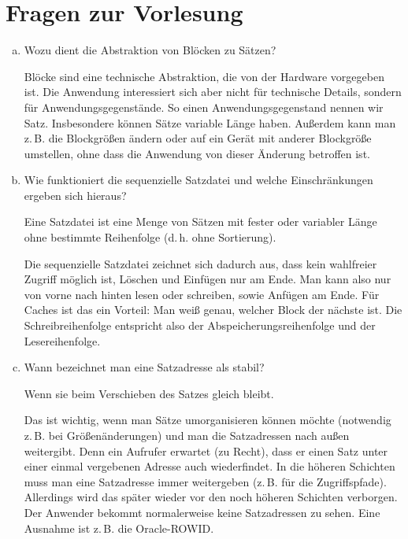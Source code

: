 \section{Fragen zur Vorlesung}
\begin{enumerate}[a)]
	\item Wozu dient die Abstraktion von Blöcken zu Sätzen?

	\begin{solution}
	Blöcke sind eine technische Abstraktion, die von der Hardware vorgegeben ist. Die Anwendung interessiert sich aber nicht für technische Details, sondern für Anwendungsgegenstände. So einen Anwendungsgegenstand nennen wir Satz. Insbesondere können Sätze variable Länge haben. Außerdem kann man z.\,B. die Blockgrößen ändern oder auf ein Gerät mit anderer Blockgröße umstellen, ohne dass die Anwendung von dieser Änderung betroffen ist.
	\end{solution}


	\item Wie funktioniert die sequenzielle Satzdatei und welche Einschränkungen ergeben sich hieraus?

	\begin{solution}
	Eine Satzdatei ist eine Menge von Sätzen mit fester oder variabler Länge ohne bestimmte Reihenfolge (d.\,h. ohne Sortierung).

	Die sequenzielle Satzdatei zeichnet sich dadurch aus, dass kein wahlfreier Zugriff möglich ist, Löschen und Einfügen nur am Ende.
	Man kann also nur von vorne nach hinten lesen oder schreiben, sowie Anfügen am Ende. Für Caches ist das ein Vorteil: Man weiß genau, welcher Block der nächste ist. Die Schreibreihenfolge entspricht also der Abspeicherungsreihenfolge und der Lesereihenfolge.
	\end{solution}


	\item Wann bezeichnet man eine Satzadresse als stabil?

	\begin{solution}
	Wenn sie beim Verschieben des Satzes gleich bleibt.

	Das ist wichtig, wenn man Sätze umorganisieren können möchte (notwendig z.\,B. bei Größenänderungen) und man die Satzadressen nach außen weitergibt. Denn ein Aufrufer erwartet (zu Recht), dass er einen Satz unter einer einmal vergebenen Adresse auch wiederfindet. In die höheren Schichten muss man eine Satzadresse immer weitergeben (z.\,B. für die Zugriffspfade). Allerdings wird das später wieder vor den noch höheren Schichten verborgen. Der Anwender bekommt normalerweise keine Satzadressen zu sehen. Eine Ausnahme ist z.\,B. die Oracle-ROWID.
	\end{solution}



\end{enumerate}
